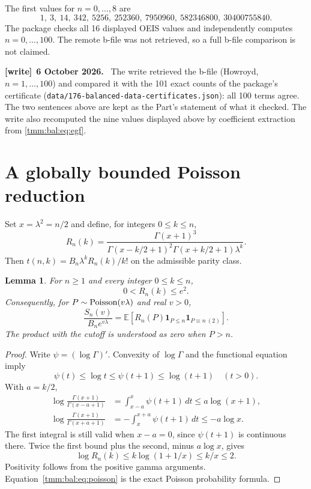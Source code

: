 \documentclass[11pt,letterpaper]{article}
\newtheorem{lemma}[theorem]{Lemma}
\theoremstyle{remark}\newtheorem{remark}[theorem]{Remark}
\newcommand{\E}{\mathbb E}\newcommand{\Pp}{\mathbb P}
\newcommand{\one}{\mathbf 1}\newcommand{\TV}{d_{\mathrm{TV}}}
\newcommand{\file}[1]{\nolinkurl{#1}}
\newenvironment{writenote}[1][]{\par\smallskip\begingroup\small
 \noindent\textbf{[write]}\if\relax\detokenize{#1}\relax\else~\textbf{#1.}\fi\ }%
 {\par\endgroup\smallskip}
\begin{document}
The first values for $n=0,\ldots,8$ are
\[
 1,\ 3,\ 14,\ 342,\ 5256,\ 252360,\ 7950960,\ 582346800,\ 30400755840.
\]
The package checks all 16 displayed OEIS values and independently computes $n=0,\ldots,100$. The remote b-file was not retrieved, so a full b-file comparison is not claimed.
\begin{writenote}[6 October 2026]
The write retrieved the b-file (Howroyd, $n=1,\dots,100$) and compared it with the 101 exact counts of the package's certificate (\file{data/176-balanced-data-certificates.json}): all 100 terms agree. The two sentences above are kept as the Part's statement of what it checked. The write also recomputed the nine values displayed above by coefficient extraction from \eqref{tmm:bal:eq:egf}.
\end{writenote}

\section{A globally bounded Poisson reduction}\label{tmm:bal:sec:poisson}
Set $x=\lambda^2=n/2$ and define, for integers $0\le k\le n$,
\begin{equation}\label{tmm:bal:eq:R}
 R_n(k)=\frac{\Gamma(x+1)^3}
 {\Gamma(x-k/2+1)^2\Gamma(x+k/2+1)\lambda^k}.
\end{equation}
Then $t(n,k)=B_n\lambda^kR_n(k)/k!$ on the admissible parity class.

\begin{lemma}\label{tmm:bal:lem:bound}
For $n\ge1$ and every integer $0\le k\le n$,
\begin{equation}\label{tmm:bal:eq:globalbound}
 0<R_n(k)\le e^2.
\end{equation}
Consequently, for $P\sim\operatorname{Poisson}(v\lambda)$ and real $v>0$,
\begin{equation}\label{tmm:bal:eq:poisson}
 \frac{S_n(v)}{B_ne^{v\lambda}}
  =\E\left[R_n(P)\one_{P\le n}\one_{P\equiv n\ (2)}\right].
\end{equation}
The product with the cutoff is understood as zero when $P>n$.
\end{lemma}
\begin{proof}
Write $\psi=(\log\Gamma)'$. Convexity of $\log\Gamma$ and the functional equation imply
\[
 \psi(t)\le\log t\le\psi(t+1)\le\log(t+1)\quad(t>0).
\]
With $a=k/2$,
\begin{align*}
 \log\frac{\Gamma(x+1)}{\Gamma(x-a+1)}
 &=\int_{x-a}^x\psi(t+1)\,dt\le a\log(x+1),\\
 \log\frac{\Gamma(x+1)}{\Gamma(x+a+1)}
 &=-\int_x^{x+a}\psi(t+1)\,dt\le-a\log x.
\end{align*}
The first integral is still valid when $x-a=0$, since $\psi(t+1)$ is continuous there. Twice the first bound plus the second, minus $a\log x$, gives
\[
 \log R_n(k)\le k\log(1+1/x)\le k/x\le2.
\]
Positivity follows from the positive gamma arguments. Equation~\eqref{tmm:bal:eq:poisson} is the exact Poisson probability formula.
\end{proof}
\end{document}
